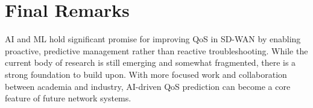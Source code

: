 \documentclass[a4paper,12pt]{Classes/RoboticsLaTeX}
\begin{document}
\section{Final Remarks}

AI and ML hold significant promise for improving QoS in SD-WAN by enabling proactive, predictive management rather than reactive troubleshooting. While the current body of research is still emerging and somewhat fragmented, there is a strong foundation to build upon. With more focused work and collaboration between academia and industry, AI-driven QoS prediction can become a core feature of future network systems.

	
	\renewcommand{\bibname}{References}           %
    
	
\end{document}
